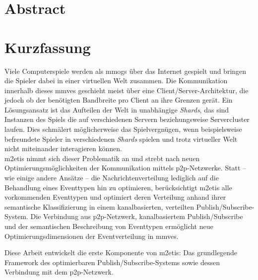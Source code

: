 \chapter*{Abstract}


\clearpage{\pagestyle{empty}\cleardoublepage}
\chapter*{Kurzfassung}
Viele Computerspiele werden als \acfp{mmog} über das Internet gespielt und bringen die Spieler dabei in einer virtuellen Welt zusammen. Die Kommunikation innerhalb dieses \acfp{mmve} geschieht meist über eine Client/Server-Architektur, die jedoch ob der benötigten Bandbreite pro Client an ihre Grenzen gerät. Ein Lösungsansatz ist das Aufteilen der Welt in unabhängige \emph{Shards}, das sind Instanzen des Spiels die auf verschiedenen Servern beziehungsweise Servercluster laufen. Dies schmälert möglicherweise das Spielvergnügen, wenn beispielsweise befreundete Spieler in verschiedenen \emph{Shards} spielen und trotz virtueller Welt nicht miteinander interagieren können.\\
\ac{m2etis} nimmt sich dieser Problematik an und strebt nach neuen Optimierungsmöglichkeiten der Kommunikation mittels \ac{p2p}-Netzwerke. Statt -- wie einige andere Ansätze -- die Nachrichtenverteilung lediglich auf die Behandlung eines Eventtypen hin zu optimieren, berücksichtigt \ac{m2etis} alle vorkommenden Eventtypen und optimiert deren Verteilung anhand ihrer semantische Klassifizierung in einem kanalbasierten, verteilten Publish/Subscribe-System. Die Verbindung aus \ac{p2p}-Netzwerk, kanalbasiertem Publish/Subscribe und der semantischen Beschreibung von Eventtypen ermöglicht neue Optimierungsdimensionen der Eventverteilung in \acp{mmve}.

Diese Arbeit entwickelt die erste Komponente von \ac{m2etis}: Das grundlegende Framework des optimierbaren Publish/Subscribe-Systems sowie dessen Verbindung mit dem \ac{p2p}-Netzwerk.
